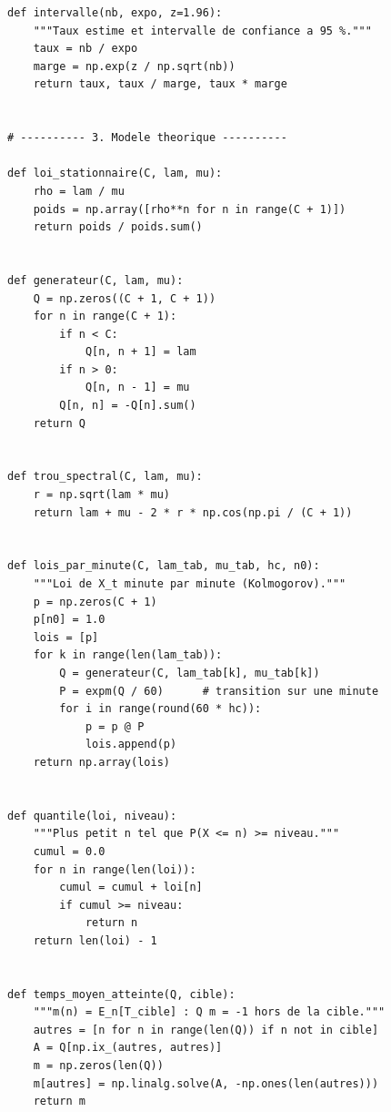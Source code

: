 \documentclass[10pt,a4paper,twocolumn]{article}
\theoremstyle{enonce}
\theoremstyle{defi}
\begin{document}
\begin{lstlisting}[style=py]
def intervalle(nb, expo, z=1.96):
    """Taux estime et intervalle de confiance a 95 %."""
    taux = nb / expo
    marge = np.exp(z / np.sqrt(nb))
    return taux, taux / marge, taux * marge


# ---------- 3. Modele theorique ----------

def loi_stationnaire(C, lam, mu):
    rho = lam / mu
    poids = np.array([rho**n for n in range(C + 1)])
    return poids / poids.sum()


def generateur(C, lam, mu):
    Q = np.zeros((C + 1, C + 1))
    for n in range(C + 1):
        if n < C:
            Q[n, n + 1] = lam
        if n > 0:
            Q[n, n - 1] = mu
        Q[n, n] = -Q[n].sum()
    return Q


def trou_spectral(C, lam, mu):
    r = np.sqrt(lam * mu)
    return lam + mu - 2 * r * np.cos(np.pi / (C + 1))


def lois_par_minute(C, lam_tab, mu_tab, hc, n0):
    """Loi de X_t minute par minute (Kolmogorov)."""
    p = np.zeros(C + 1)
    p[n0] = 1.0
    lois = [p]
    for k in range(len(lam_tab)):
        Q = generateur(C, lam_tab[k], mu_tab[k])
        P = expm(Q / 60)      # transition sur une minute
        for i in range(round(60 * hc)):
            p = p @ P
            lois.append(p)
    return np.array(lois)


def quantile(loi, niveau):
    """Plus petit n tel que P(X <= n) >= niveau."""
    cumul = 0.0
    for n in range(len(loi)):
        cumul = cumul + loi[n]
        if cumul >= niveau:
            return n
    return len(loi) - 1


def temps_moyen_atteinte(Q, cible):
    """m(n) = E_n[T_cible] : Q m = -1 hors de la cible."""
    autres = [n for n in range(len(Q)) if n not in cible]
    A = Q[np.ix_(autres, autres)]
    m = np.zeros(len(Q))
    m[autres] = np.linalg.solve(A, -np.ones(len(autres)))
    return m
\end{lstlisting}
\end{document}

